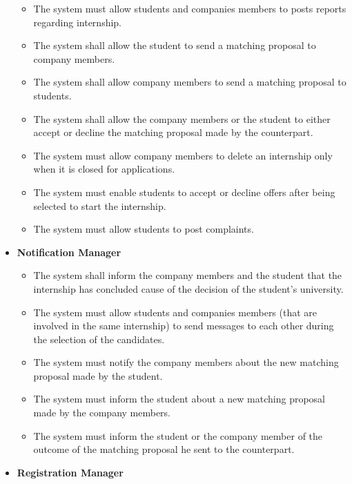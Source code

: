 \begin{itemize}
\begin{itemize}
        \item [\text{ [R26] }] The system must allow students and companies members to posts reports regarding internship.
        \item [\text{ [R28] }] The system shall allow the student to send a matching proposal to company members.
        \item [\text{ [R29] }] The system shall allow company members to send a matching proposal to students.
        \item [\text{ [R32] }] The system shall allow the company members or the student to either accept or decline the matching proposal made by the counterpart.
        \item [\text{ [R33] }] The system must allow company members to delete an internship only when it is closed for applications.
        \item [\text{ [R34] }] The system must enable students to accept or decline offers after being selected to start the internship.
        \item [\text{ [R35] }] The system must allow students to post complaints.\\
    \end{itemize}
    \item \textbf{Notification Manager}
    \begin{itemize}
        \item [\text{ [R21] }] The system shall inform the company members and the student that the internship has concluded cause of the decision of the student's university.
        \item [\text{ [R25] }] The system must allow students and companies members (that are involved in the same internship) to send messages to each other during the selection of the candidates.
        \item [\text{ [R27] }] The system must notify the company members about the new matching proposal made by the student.
        \item [\text{ [R30] }] The system must inform the student about a new matching proposal made by the company members.
        \item [\text{ [R31] }] The system must inform the student or the company member of the outcome of the matching proposal he sent to the counterpart.\\
    \end{itemize}
    \item \textbf{Registration Manager}
    \begin{itemize}

\end{itemize}
\end{itemize}
